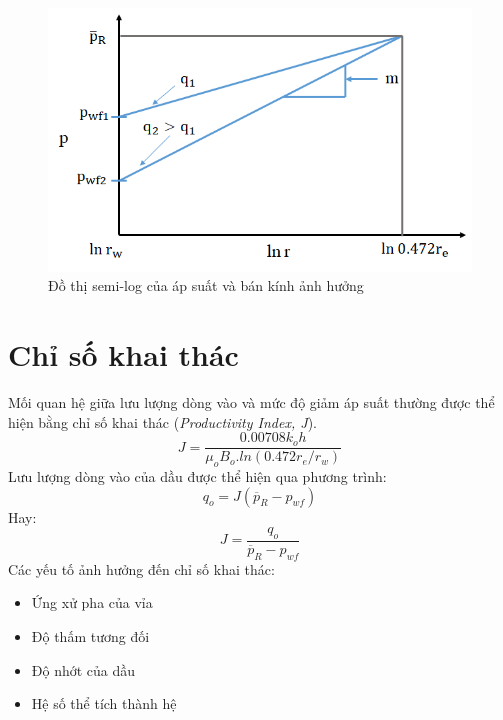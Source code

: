 \documentclass[12pt,a4paper]{report}
\begin{document}
	\begin{figure}[h]
		\centering
		\includegraphics[scale=0.75]{Fig/p_reservoir_vs_radius_semi_log.png}
		\caption{Đồ thị semi-log của áp suất và bán kính ảnh hưởng}
		\label{fig:p_reservoir_vs_radius_semi_log}
	\end{figure}

\section{Chỉ số khai thác}
Mối quan hệ giữa lưu lượng dòng vào và mức độ giảm áp suất thường được thể hiện bằng chỉ số khai thác (\textit{Productivity Index, J}).
	\begin{equation}
		J = \dfrac{0.00708k_oh}{\mu_oB_o.ln(0.472r_e/r_w)}
	\end{equation}
Lưu lượng dòng vào của dầu được thể hiện qua phương trình:
	\begin{equation}
		q_o = J(\overline p_R - p_{wf})
	\end{equation}
Hay:
	\begin{equation}
		J = \dfrac{q_o}{\overline p_R - p_{wf}}
	\end{equation}
Các yếu tố ảnh hưởng đến chỉ số khai thác:
	\begin{itemize}
		\item Ứng xử pha của vỉa
		\item Độ thấm tương đối
		\item Độ nhớt của dầu
		\item Hệ số thể tích thành hệ
	\end{itemize}
\end{document}
